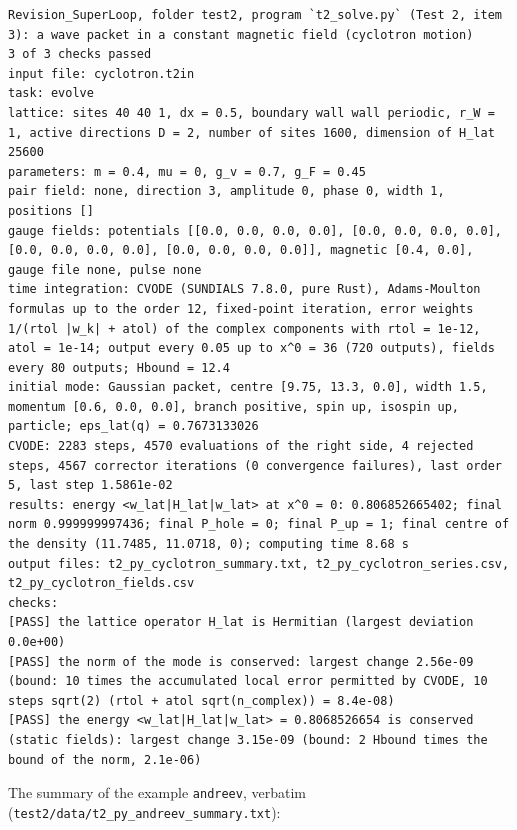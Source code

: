 \documentclass[
  10pt,
]{article}
\begin{document}
\begin{verbatim}
Revision_SuperLoop, folder test2, program `t2_solve.py` (Test 2, item 3): a wave packet in a constant magnetic field (cyclotron motion)
3 of 3 checks passed
input file: cyclotron.t2in
task: evolve
lattice: sites 40 40 1, dx = 0.5, boundary wall wall periodic, r_W = 1, active directions D = 2, number of sites 1600, dimension of H_lat 25600
parameters: m = 0.4, mu = 0, g_v = 0.7, g_F = 0.45
pair field: none, direction 3, amplitude 0, phase 0, width 1, positions []
gauge fields: potentials [[0.0, 0.0, 0.0, 0.0], [0.0, 0.0, 0.0, 0.0], [0.0, 0.0, 0.0, 0.0], [0.0, 0.0, 0.0, 0.0]], magnetic [0.4, 0.0], gauge file none, pulse none
time integration: CVODE (SUNDIALS 7.8.0, pure Rust), Adams-Moulton formulas up to the order 12, fixed-point iteration, error weights 1/(rtol |w_k| + atol) of the complex components with rtol = 1e-12, atol = 1e-14; output every 0.05 up to x^0 = 36 (720 outputs), fields every 80 outputs; Hbound = 12.4
initial mode: Gaussian packet, centre [9.75, 13.3, 0.0], width 1.5, momentum [0.6, 0.0, 0.0], branch positive, spin up, isospin up, particle; eps_lat(q) = 0.7673133026
CVODE: 2283 steps, 4570 evaluations of the right side, 4 rejected steps, 4567 corrector iterations (0 convergence failures), last order 5, last step 1.5861e-02
results: energy <w_lat|H_lat|w_lat> at x^0 = 0: 0.806852665402; final norm 0.999999997436; final P_hole = 0; final P_up = 1; final centre of the density (11.7485, 11.0718, 0); computing time 8.68 s
output files: t2_py_cyclotron_summary.txt, t2_py_cyclotron_series.csv, t2_py_cyclotron_fields.csv
checks:
[PASS] the lattice operator H_lat is Hermitian (largest deviation 0.0e+00)
[PASS] the norm of the mode is conserved: largest change 2.56e-09 (bound: 10 times the accumulated local error permitted by CVODE, 10 steps sqrt(2) (rtol + atol sqrt(n_complex)) = 8.4e-08)
[PASS] the energy <w_lat|H_lat|w_lat> = 0.8068526654 is conserved (static fields): largest change 3.15e-09 (bound: 2 Hbound times the bound of the norm, 2.1e-06)
\end{verbatim}

The summary of the example \texttt{andreev}, verbatim
(\texttt{test2/data/t2\_py\_andreev\_summary.txt}):
\end{document}
